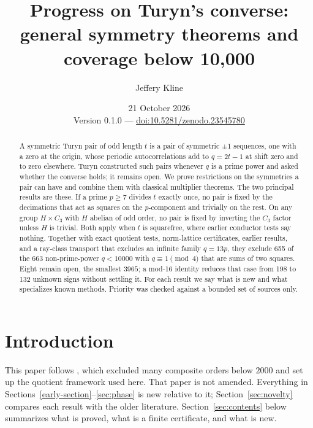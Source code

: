 \documentclass[11pt]{article}
\title{Progress on Turyn's converse:\\
general symmetry theorems and coverage below 10,000}
\author{Jeffery Kline}
\date{21 October 2026\\\small Version 0.1.0 --- \href{https://doi.org/10.5281/zenodo.23545780}{doi:10.5281/zenodo.23545780}}
\theoremstyle{definition}
\theoremstyle{remark}
\begin{document}
\maketitle
\begin{abstract}
A symmetric Turyn pair of odd length $t$ is a pair of symmetric $\pm1$
sequences, one with a zero at the origin, whose periodic autocorrelations
add to $q=2t-1$ at shift zero and to zero elsewhere. Turyn constructed such
pairs whenever $q$ is a prime power and asked whether the converse holds;
it remains open. We prove restrictions on the symmetries a pair can have and
combine them with classical multiplier theorems. The two principal results
are these. If a prime $p\ge7$ divides $t$ exactly once, no pair is fixed by
the decimations that act as squares on the $p$-component and trivially on
the rest. On any group $H\times C_3$ with $H$ abelian of odd order, no pair
is fixed by inverting the $C_3$ factor unless $H$ is trivial. Both apply
when $t$ is squarefree, where earlier conductor tests say nothing. Together with exact quotient tests, norm-lattice certificates, earlier
results, and a ray-class transport that excludes an infinite family $q=13p$,
they exclude 655 of the 663 non-prime-power $q<10000$ with
$q\equiv1\pmod4$ that are sums of two squares. Eight remain open, the smallest $3965$; a mod-16 identity reduces
that case from 198 to 132 unknown signs without settling it. For each
result we say what is new and what specializes known methods. Priority was
checked against a bounded set of sources only.
\end{abstract}

\tableofcontents

\section{Introduction}\label{sec:scope}
This paper follows \cite{Kline26}, which excluded many composite orders
below $2000$ and set up the quotient framework used here. That paper is not
amended. Everything in Sections~\ref{early-section}--\ref{sec:phase} is new
relative to it; Section~\ref{sec:novelty} compares each result with the older
literature. Section~\ref{sec:contents} below summarizes what is proved, what
is a finite certificate, and what is new.
\end{document}
